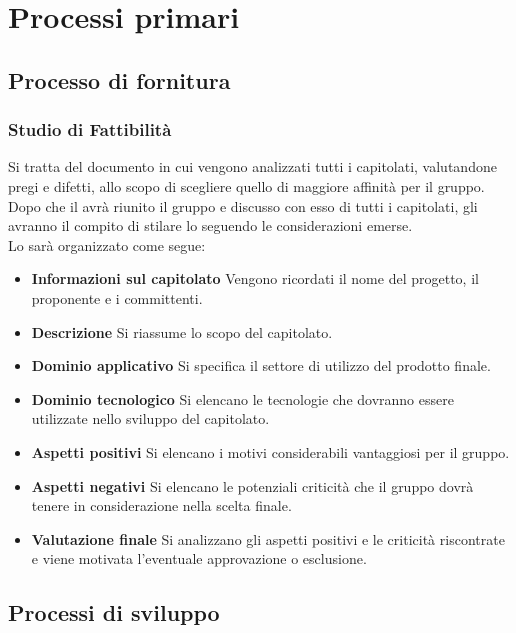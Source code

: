 \section{Processi primari}
\subsection{Processo di fornitura}

\subsubsection{Studio di Fattibilità}
Si tratta del documento in cui vengono analizzati tutti i capitolati, valutandone pregi e difetti, allo scopo di scegliere quello di maggiore affinità per il gruppo.
Dopo che il \emph{\RdP} avrà riunito il gruppo e discusso con esso di tutti i capitolati, gli \emph{\anas} avranno il compito di stilare lo \emph{\SdF} 
seguendo le considerazioni emerse.\\
Lo \emph{\SdF} sarà organizzato come segue:
\begin{itemize}
	\item \textbf{Informazioni sul capitolato}
	Vengono ricordati il nome del progetto, il proponente e i committenti.
	\item \textbf{Descrizione}
	Si riassume lo scopo del capitolato.
	\item \textbf{Dominio applicativo}
	Si specifica il settore di utilizzo del prodotto finale.
	\item \textbf{Dominio tecnologico}
	Si elencano le tecnologie che dovranno essere utilizzate nello sviluppo del capitolato.
	\item \textbf{Aspetti positivi}
	Si elencano i motivi considerabili vantaggiosi per il gruppo.
	\item \textbf{Aspetti negativi}
	Si elencano le potenziali criticità che il gruppo dovrà tenere in considerazione nella scelta finale.
	\item \textbf{Valutazione finale}
	Si analizzano gli aspetti positivi e le criticità riscontrate e viene motivata l'eventuale approvazione o esclusione.
\end{itemize}

\begin{comment}
\subsubsection{Rapporti con il proponente}
Una volta scelto il capitolato, ci si dovrà confrontare con il proponente come segue:
\begin{itemize}
	\item \textbf{Primo contatto}
	Sfruttando i contatti messi a disposizione nella descrizione del capitolato, si contatta il proponente per verificarne l'effettiva disponibilità.
	\item \textbf{Definizione dei canali di comunicazione}
	Si dovrà concordare un metodo di comunicazione adatto ad entrambe le parti, per un confronto facile ed immediato tra fornitore e proponente.
\end{itemize}
\\
Confronto per le tecnologie da usare.
\end{comment}

\subsection{Processi di sviluppo}

